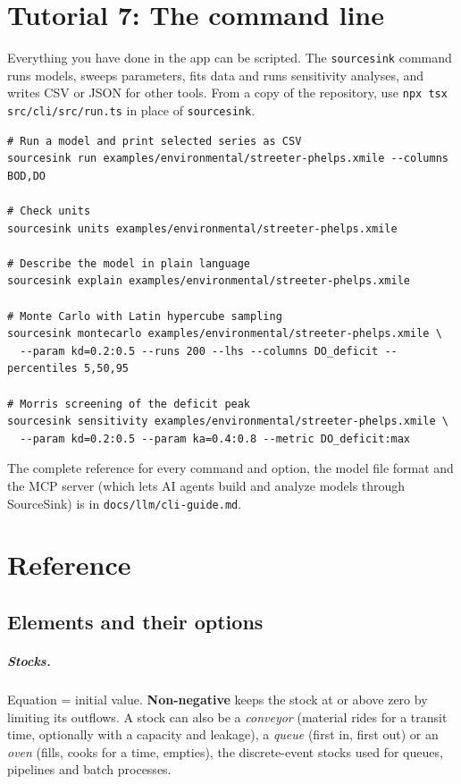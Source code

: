 \documentclass[11pt,oneside]{book}
\newcommand{\ui}[1]{\textsf{\textbf{#1}}}                       %
\begin{document}
\chapter{Tutorial 7: The command line}\label{ch:t7}

Everything you have done in the app can be scripted. The \texttt{sourcesink}
command runs models, sweeps parameters, fits data and runs sensitivity
analyses, and writes CSV or JSON for other tools. From a copy of the
repository, use \texttt{npx tsx src/cli/src/run.ts} in place of
\texttt{sourcesink}.

\begin{lstlisting}
# Run a model and print selected series as CSV
sourcesink run examples/environmental/streeter-phelps.xmile --columns BOD,DO

# Check units
sourcesink units examples/environmental/streeter-phelps.xmile

# Describe the model in plain language
sourcesink explain examples/environmental/streeter-phelps.xmile

# Monte Carlo with Latin hypercube sampling
sourcesink montecarlo examples/environmental/streeter-phelps.xmile \
  --param kd=0.2:0.5 --runs 200 --lhs --columns DO_deficit --percentiles 5,50,95

# Morris screening of the deficit peak
sourcesink sensitivity examples/environmental/streeter-phelps.xmile \
  --param kd=0.2:0.5 --param ka=0.4:0.8 --metric DO_deficit:max
\end{lstlisting}

The complete reference for every command and option, the model file format
and the MCP server (which lets AI agents build and analyze models through
SourceSink) is in \texttt{docs/llm/cli-guide.md}.

\chapter{Reference}\label{ch:ref}

\section{Elements and their options}

\paragraph{Stocks.} Equation = initial value. \ui{Non-negative} keeps the
stock at or above zero by limiting its outflows. A stock can also be a
\emph{conveyor} (material rides for a transit time, optionally with a
capacity and leakage), a \emph{queue} (first in, first out) or an
\emph{oven} (fills, cooks for a time, empties), the discrete-event stocks used
for queues, pipelines and batch processes.
\end{document}
